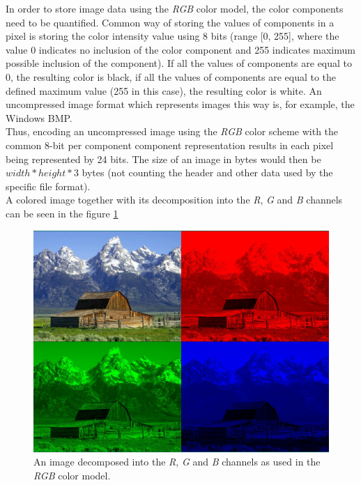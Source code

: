 \documentclass[thesis=M,english]{FITthesis}[2012/10/20]
\begin{document}
In order to store image data using the \emph{RGB} color model, the color components
need to be quantified. Common way of storing the values of components in a pixel
is storing the color intensity value using 8 bits (range [0, 255], where the
value 0 indicates no inclusion of the color component and 255 indicates maximum
possible inclusion of the component). If all the values of components are
equal to 0, the resulting color is black, if all the values of components are
equal to the defined maximum value (255 in this case), the resulting color
is white. An uncompressed image format which represents images this way is, for
example, the Windows BMP.\cite{fileformat-bmp}
\\

Thus, encoding an uncompressed image using the \emph{RGB} color scheme with
the common 8-bit per component component representation results in each pixel
being represented by 24 bits. The size of an image in bytes would then be
$width*height*3$ bytes (not counting the header and other data used by the
specific file format).
\\

A colored image together with its decomposition into the \emph{R}, \emph{G}
and \emph{B} channels can be seen in the figure \ref{fig:house-rgbdecomp}

\begin{figure}[h]
  \centering
  \includegraphics[scale=0.5]{imgs/house-rgbdecomp}
  \caption{An image decomposed into the \emph{R}, \emph{G} and \emph{B} channels
           as used in the \emph{RGB} color model.}
  \label{fig:house-rgbdecomp}
\end{figure}
\end{document}
